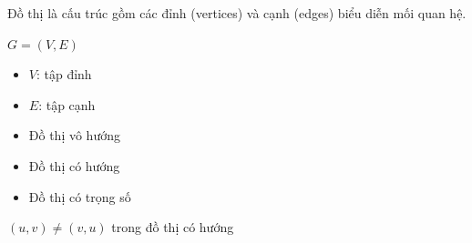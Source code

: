 \documentclass{beamer}
\title{\hlred{Khái niệm cơ bản về Đồ Thị}}
\author{NHÓM 3}
\date{\today}
\newcommand{\hlblue}[1]{\textcolor{myblue}{#1}}
\newcommand{\hlpurple}[1]{\textcolor{mypurple}{#1}}
\begin{document}
\frame{\titlepage}


\begin{frame}{}
\begin{tcolorbox}[title=\textbf{\hlwhite{Định nghĩa}}]
Đồ thị là cấu trúc gồm các \hlblue{đỉnh (vertices)} và \hlblue{cạnh (edges)} biểu diễn mối quan hệ.
\end{tcolorbox}

\begin{tcolorbox}
\centering
\hlpurple{$G = (V, E)$}
\end{tcolorbox}

\begin{itemize}
\item $V$: tập đỉnh
\item $E$: tập cạnh
\end{itemize}
\end{frame}


\begin{frame}{}
\centering
{}
\end{frame}


\begin{frame}{}
\begin{itemize}
\item \hlblue{Đồ thị vô hướng}
\item \hlblue{Đồ thị có hướng}
\item \hlblue{Đồ thị có trọng số}
\end{itemize}

\begin{tcolorbox}
\centering
\hlpurple{$(u,v) \neq (v,u)$ trong đồ thị có hướng}
\end{tcolorbox}
\end{frame}

\end{document}
